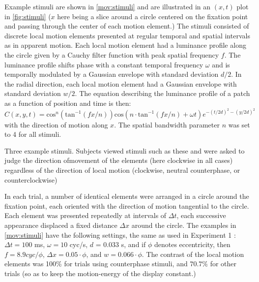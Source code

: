 \documentclass[manuscript]{subfiles}
\begin{document}
Example stimuli are shown in \autoref{mov:stimuli} and are illustrated in an $(x, t)$ plot in \autoref{fig:stimuli} ($x$ here being a slice around a circle centered on the fixation point and passing through the center of each motion element.) The stimuli consisted of discrete local motion elements
presented at regular temporal and spatial intervals as in apparent
motion. Each local motion element had a luminance profile along the
circle given by a Cauchy filter function
\citep{Klein:1985rz} with peak spatial frequency $f$. The luminance
profile shifts phase with a constant temporal frequency $\omega$ and
is temporally modulated by a Gaussian envelope with standard deviation
$d/2$. In the radial direction, each local motion
element had a Gaussian envelope with standard deviation $w/2$. The
equation describing the luminance profile of a patch as a function of
position and time is then:
\begin{equation*}
C(x, y, t) = \mathrm{cos}^n(\mathrm{tan}^{-1}(fx/n))\mathrm{cos}(n \cdot \mathrm{tan}^{-1}(fx/n) + {\omega}t) e^{-(t/2d)^2-(y/2d)^2}
\end{equation*}
with the direction of motion along $x$.  The spatial bandwidth
parameter $n$ was set to 4 for all stimuli.

\begin{movie}
  \caption{Three example stimuli. Subjects viewed stimuli such as these and were asked to judge the direction ofmovement of the elements (here clockwise in all cases) regardless of the direction of local motion (clockwise, neutral counterphase, or counterclockwise)}
  \label{mov:stimuli}
\end{movie}

In each trial, a number of identical elements were arranged in a circle around the fixation point, each oriented with the direction of motion tangential to the circle. Each element was presented repeatedly at intervals of ${\Delta}t$, each successive appearance displaced a fixed distance ${\Delta}x$ around the circle. The examples in \autoref{mov:stimuli} have the following settings, the same as used in Experiment 1 : ${\Delta}t = 100$ ms, $\omega = 10$ cyc/s, $d$ = 0.033 s, and if $\phi$ denotes eccentricity, then $f = 8.9 cyc/\phi$, ${\Delta}x = 0.05 \cdot \phi$, and $w = 0.066 \cdot \phi$. The contrast of the local motion elements was 100\% for trials using counterphase stimuli, and $70.7\%$ for other trials (so as to keep the motion-energy of the display constant.)
\end{document}
